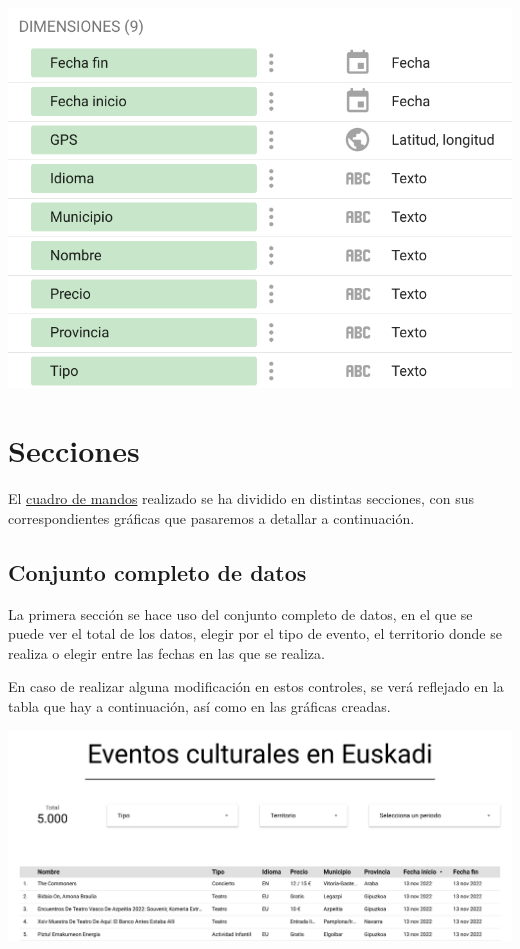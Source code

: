 \documentclass{\ClassPath/viu-tfm-template}
\begin{document}
\begin{center}
    \includegraphics[width=0.6\linewidth]{img/datos.png}
\end{center}

\section{Secciones}

El \href{https://datastudio.google.com/reporting/2322c44e-ad75-4243-a4a5-257be6d754bf/page/9AT6C}{cuadro de mandos} realizado se ha dividido en distintas secciones, con sus correspondientes gráficas que pasaremos a detallar a continuación.


\subsection{Conjunto completo de datos}

La primera sección se hace uso del conjunto completo de datos, en el que se puede ver el total de los datos, elegir por el tipo de evento, el territorio donde se realiza o elegir entre las fechas en las que se realiza.

En caso de realizar alguna modificación en estos controles, se verá reflejado en la tabla que hay a continuación, así como en las gráficas creadas.

\begin{center}
    \includegraphics[frame,width=0.83\linewidth]{img/cabecera.png}
\end{center}
\end{document}
